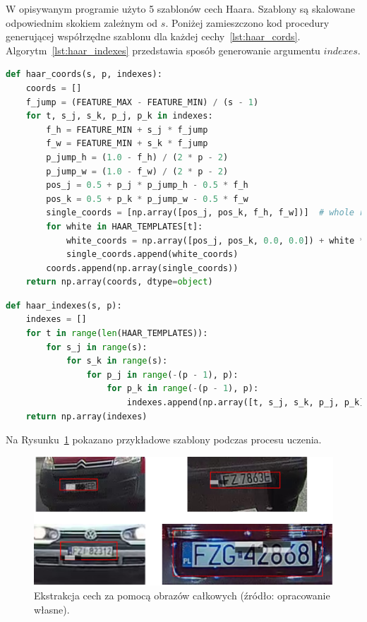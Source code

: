 W opisywanym programie użyto 5 szablonów cech Haara.
Szablony są skalowane odpowiednim skokiem zależnym od $s$.
Poniżej zamieszczono kod procedury generującej współrzędne szablonu dla każdej cechy~\ref{lst:haar_cords}.
Algorytm~\ref{lst:haar_indexes} przedstawia sposób generowanie argumentu $indexes$.
\begin{lstlisting}[language=Python, caption=Procedura generujące szablony cech Haara dla konkretnych wpsółrzędnych., label={lst:haar_cords}]
def haar_coords(s, p, indexes):
    coords = []
    f_jump = (FEATURE_MAX - FEATURE_MIN) / (s - 1)
    for t, s_j, s_k, p_j, p_k in indexes:
        f_h = FEATURE_MIN + s_j * f_jump
        f_w = FEATURE_MIN + s_k * f_jump
        p_jump_h = (1.0 - f_h) / (2 * p - 2)
        p_jump_w = (1.0 - f_w) / (2 * p - 2)
        pos_j = 0.5 + p_j * p_jump_h - 0.5 * f_h
        pos_k = 0.5 + p_k * p_jump_w - 0.5 * f_w
        single_coords = [np.array([pos_j, pos_k, f_h, f_w])]  # whole rectangle for single feature
        for white in HAAR_TEMPLATES[t]:
            white_coords = np.array([pos_j, pos_k, 0.0, 0.0]) + white * np.array([f_h, f_w, f_h, f_w])
            single_coords.append(white_coords)
        coords.append(np.array(single_coords))
    return np.array(coords, dtype=object)
\end{lstlisting}
\begin{lstlisting}[language=Python, caption=Procedura generujące indeksy., label={lst:haar_indexes}]
def haar_indexes(s, p):
    indexes = []
    for t in range(len(HAAR_TEMPLATES)):
        for s_j in range(s):
            for s_k in range(s):
                for p_j in range(-(p - 1), p):
                    for p_k in range(-(p - 1), p):
                        indexes.append(np.array([t, s_j, s_k, p_j, p_k]))
    return np.array(indexes)
\end{lstlisting}

Na Rysunku~\ref{fig:haar_feats_examples} pokazano przykładowe szablony podczas procesu uczenia.
\begin{figure}[!ht]
    \centering
    \includegraphics[scale=0.6]{Pictures/haar_tepmplates}
    \caption{Ekstrakcja cech za pomocą obrazów całkowych (źródło: opracowanie własne).}
    \label{fig:haar_feats_examples}
\end{figure}
\FloatBarrier

